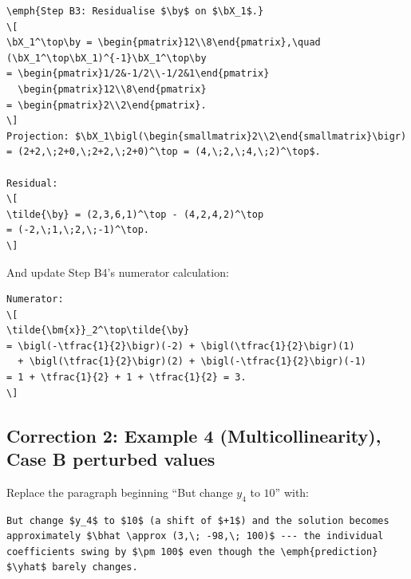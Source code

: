 \begin{verbatim}
\emph{Step B3: Residualise $\by$ on $\bX_1$.}
\[
\bX_1^\top\by = \begin{pmatrix}12\\8\end{pmatrix},\quad
(\bX_1^\top\bX_1)^{-1}\bX_1^\top\by
= \begin{pmatrix}1/2&-1/2\\-1/2&1\end{pmatrix}
  \begin{pmatrix}12\\8\end{pmatrix}
= \begin{pmatrix}2\\2\end{pmatrix}.
\]
Projection: $\bX_1\bigl(\begin{smallmatrix}2\\2\end{smallmatrix}\bigr)
= (2+2,\;2+0,\;2+2,\;2+0)^\top = (4,\;2,\;4,\;2)^\top$.

Residual:
\[
\tilde{\by} = (2,3,6,1)^\top - (4,2,4,2)^\top
= (-2,\;1,\;2,\;-1)^\top.
\]
\end{verbatim}

And update Step B4's numerator calculation:

\begin{verbatim}
Numerator:
\[
\tilde{\bm{x}}_2^\top\tilde{\by}
= \bigl(-\tfrac{1}{2}\bigr)(-2) + \bigl(\tfrac{1}{2}\bigr)(1)
  + \bigl(\tfrac{1}{2}\bigr)(2) + \bigl(-\tfrac{1}{2}\bigr)(-1)
= 1 + \tfrac{1}{2} + 1 + \tfrac{1}{2} = 3.
\]
\end{verbatim}



\subsection*{Correction 2: Example 4 (Multicollinearity), Case B perturbed values}

Replace the paragraph beginning ``But change $y_4$ to $10$'' with:

\begin{verbatim}
But change $y_4$ to $10$ (a shift of $+1$) and the solution becomes
approximately $\bhat \approx (3,\; -98,\; 100)$ --- the individual
coefficients swing by $\pm 100$ even though the \emph{prediction}
$\yhat$ barely changes.
\end{verbatim}

